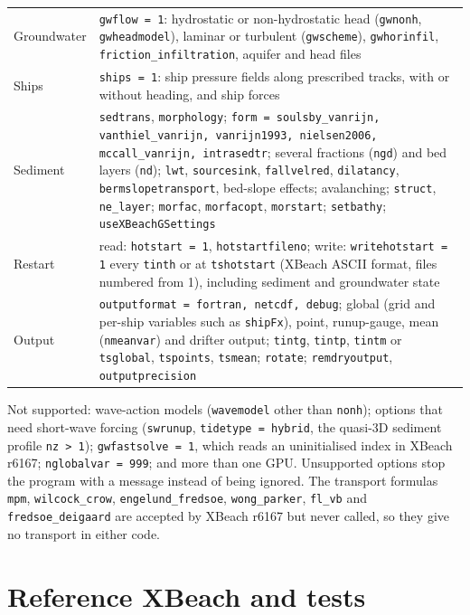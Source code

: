 \documentclass[11pt,a4paper]{article}
\newcommand{\code}[1]{\texttt{#1}}
\begin{document}
\begin{center}
\begin{tabularx}{\textwidth}{lX}
Groundwater & \code{gwflow = 1}: hydrostatic or non-hydrostatic head (\code{gwnonh}, \code{gwheadmodel}), laminar or turbulent (\code{gwscheme}), \code{gwhorinfil}, \code{friction\_infiltration}, aquifer and head files \\
Ships & \code{ships = 1}: ship pressure fields along prescribed tracks, with or without heading, and ship forces \\
Sediment & \code{sedtrans}, \code{morphology}; \code{form = soulsby\_vanrijn, vanthiel\_vanrijn, vanrijn1993, nielsen2006, mccall\_vanrijn, intrasedtr}; several fractions (\code{ngd}) and bed layers (\code{nd}); \code{lwt}, \code{sourcesink}, \code{fallvelred}, \code{dilatancy}, \code{bermslopetransport}, bed-slope effects; avalanching; \code{struct}, \code{ne\_layer}; \code{morfac}, \code{morfacopt}, \code{morstart}; \code{setbathy}; \code{useXBeachGSettings} \\
Restart & read: \code{hotstart = 1}, \code{hotstartfileno}; write: \code{writehotstart = 1} every \code{tinth} or at \code{tshotstart} (XBeach ASCII format, files numbered from 1), including sediment and groundwater state \\
Output & \code{outputformat = fortran, netcdf, debug}; global (grid and per-ship variables such as \code{shipFx}), point, runup-gauge, mean (\code{nmeanvar}) and drifter output; \code{tintg}, \code{tintp}, \code{tintm} or \code{tsglobal}, \code{tspoints}, \code{tsmean}; \code{rotate}; \code{remdryoutput}, \code{outputprecision} \\
\bottomrule
\end{tabularx}
\end{center}
Not supported: wave-action models (\code{wavemodel} other than \code{nonh}); options that need short-wave
forcing (\code{swrunup}, \code{tidetype = hybrid}, the quasi-3D sediment profile \code{nz > 1});
\code{gwfastsolve = 1}, which reads an uninitialised index in XBeach r6167; \code{nglobalvar = 999}; and
more than one GPU. Unsupported options stop the program with a message instead of being ignored. The
transport formulas \code{mpm}, \code{wilcock\_crow}, \code{engelund\_fredsoe}, \code{wong\_parker},
\code{fl\_vb} and \code{fredsoe\_deigaard} are accepted by XBeach r6167 but never called, so they give no
transport in either code.

\section{Reference XBeach and tests}\label{sec:xbeach}
\end{document}
